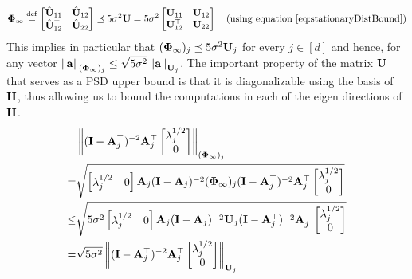 \begin{align*}
\boldsymbol{\Phi}_{\infty}\stackrel{\mathrm{def}}{=}\begin{bmatrix}\hat{\mathbf{U}}_{11}&\hat{\mathbf{U}}_{12} \\ \hat{\mathbf{U}}_{12}^{\top}&\hat{\mathbf{U}}_{22}\end{bmatrix} \preceq 5\sigma^2 \mathbf{U} = 5\sigma^2 \begin{bmatrix} \mathbf{U}_{11} & \mathbf{U}_{12}\\\mathbf{U}_{12}^{\top}&\mathbf{U}_{22}\end{bmatrix}\quad(\text{using equation~\ref{eq:stationaryDistBound}})
\end{align*}
This implies in particular that $(\boldsymbol{\Phi}_{\infty})_j \preceq 5 \sigma^2 \mathbf{U}_j$ for every $j\in[d]$ and hence, for any vector $\left\lVert\mathbf{a}\right\rVert_{(\boldsymbol{\Phi}_{\infty})_j}\leq \sqrt{5\sigma^2}\left\lVert\mathbf{a}\right\rVert_{\mathbf{U}_j}$. The important property of the matrix $\mathbf{U}$ that serves as a PSD upper bound is that it is diagonalizable using the basis of $\mathbf{H}$, thus allowing us to bound the computations in each of the eigen directions of $\mathbf{H}$. %
\begin{align}
\label{eq:p1}
&\left\lVert(\mathbf{I}-\mathbf{A}_j^{\top})^{-2}\mathbf{A}_j^{\top}\begin{bmatrix}\lambda_j^{1/2}\\0\end{bmatrix}\right\rVert_{(\boldsymbol{\Phi}_{\infty})_j}\nonumber\\
=&\sqrt{\begin{bmatrix}\lambda_j^{1/2}&0\end{bmatrix}\mathbf{A}_j(\mathbf{I}-\mathbf{A}_j)^{-2}(\boldsymbol{\Phi}_{\infty})_j(\mathbf{I}-\mathbf{A}_j^{\top})^{-2}\mathbf{A}_j^{\top}\begin{bmatrix}\lambda_j^{1/2}\\0\end{bmatrix}}\nonumber\\
\leq&\sqrt{5\sigma^2\begin{bmatrix}\lambda_j^{1/2}&0\end{bmatrix}\mathbf{A}_j(\mathbf{I}-\mathbf{A}_j)^{-2}\mathbf{U}_j(\mathbf{I}-\mathbf{A}_j^{\top})^{-2}\mathbf{A}_j^{\top}\begin{bmatrix}\lambda_j^{1/2}\\0\end{bmatrix}}\nonumber\\
=&\sqrt{5\sigma^2}\left\lVert(\mathbf{I}-\mathbf{A}_j^{\top})^{-2}\mathbf{A}_j^{\top}\begin{bmatrix}\lambda_j^{1/2}\\0\end{bmatrix}\right\rVert_{\mathbf{U}_j}
\end{align}

